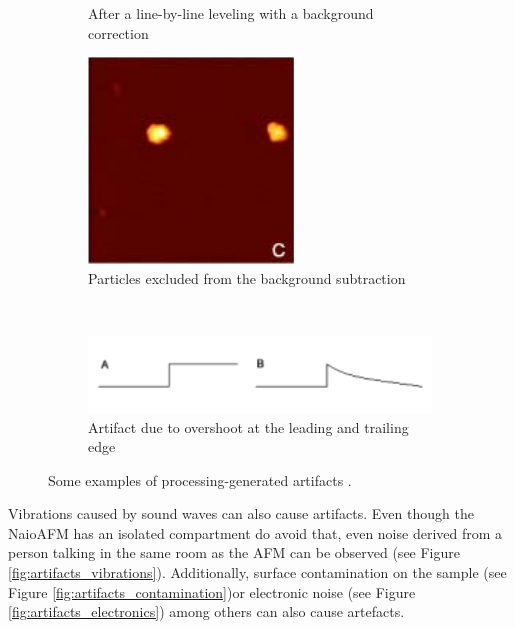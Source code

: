 \documentclass[11pt,a4paper]{article}
\begin{document}
\begin{figure}[H]
\begin{subfigure}[b]{0.3\textwidth}
\caption{After a line-by-line leveling with a background correction}
\label{fig:artifacts_processing_2}
\end{subfigure}
\begin{subfigure}[b]{0.3\textwidth}
\includegraphics[width=\textwidth]{artifacts_processing_3}
\caption{Particles excluded from the background subtraction}
\label{fig:artifacts_processing_3}
\end{subfigure}\\\vspace{.2cm}
\begin{subfigure}[b]{0.6\textwidth}
\includegraphics[width=\textwidth]{artifacts_processing_4}
\caption{Artifact due to overshoot at the leading and trailing edge}
\label{fig:artifacts_processing_4}
\end{subfigure}
\caption{Some examples of processing-generated artifacts \cite{artifacts}.}
\label{fig:artifacts_processing}
\end{figure}

Vibrations caused by sound waves can also cause artifacts. Even though the NaioAFM has an isolated compartment do avoid that, even noise derived from a person talking in the same room as the AFM can be observed (see Figure \ref{fig:artifacts_vibrations}). Additionally, surface contamination on the sample (see Figure \ref{fig:artifacts_contamination})or electronic noise (see Figure \ref{fig:artifacts_electronics}) among others can also cause artefacts.
\end{document}
